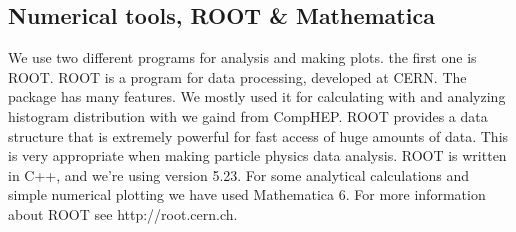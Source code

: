 \subsection{Numerical tools, ROOT \& Mathematica}
We use two different programs for analysis and making plots. the first one is ROOT. ROOT is a program for data processing, developed at CERN. The package has many features. We mostly used it for calculating with and analyzing histogram distribution with we gaind from CompHEP. ROOT provides a data structure that is extremely powerful for fast access of huge amounts of data. This is very appropriate when making particle physics data analysis. ROOT is written in C++, and we're using version 5.23. For some analytical calculations and simple numerical plotting we have used Mathematica 6. For more information about ROOT see http://root.cern.ch.